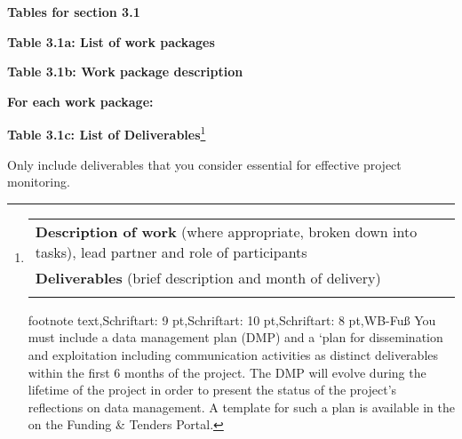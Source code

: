 \textbf{Tables for section 3.1}

\textbf{Table 3.1a: List of work packages}

\textbf{Table 3.1b: Work package description }

\textbf{For each work package: }

\textbf{Table 3.1c: List of Deliverables}\footnote{\begin{longtable}[]{@{}l@{}}
  \toprule
  \endhead
  \textbf{Description of work} (where appropriate, broken down into
  tasks), lead partner and role of participants \\
  \textbf{Deliverables} (brief description and month of delivery) \\
   \\
  \bottomrule
  \end{longtable}

  footnote text,Schriftart: 9 pt,Schriftart: 10 pt,Schriftart: 8
  pt,WB-Fuß You must include a data management plan (DMP) and a `plan
  for dissemination and exploitation including communication activities
  as distinct deliverables within the first 6 months of the project. The
  DMP will evolve during the lifetime of the project in order to present
  the status of the project's reflections on data management. A template
  for such a plan is available in the on the Funding \& Tenders Portal.}\textbf{
}

Only include deliverables that you consider essential for effective
project monitoring.

